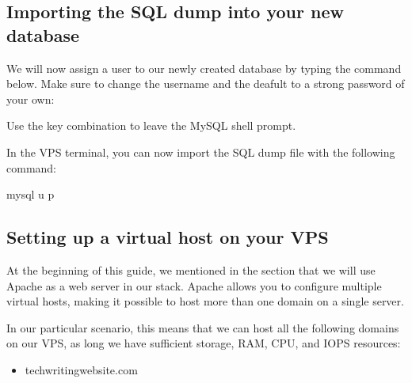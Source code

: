 \documentclass[a4paper,10pt,english,openany,oneside]{sphinxmanual}
\begin{document}
\begin{sloppypar}
\subsection{Importing the SQL dump into your new database}
\label{\detokenize{joomla-to-vps:importing-the-sql-dump-into-your-new-database}}
\sphinxAtStartPar
We will now assign a user  to our newly created database by typing the command below. Make sure to change the username  and the deafult  to a strong password of your own:

\begin{sphinxVerbatim}[commandchars=\\\{\}]
\end{sphinxVerbatim}

\sphinxAtStartPar
Use the key combination  to leave the MySQL shell prompt.

\sphinxAtStartPar
In the VPS terminal, you can now import the SQL dump file with the following command:

\begin{sphinxVerbatim}[commandchars=\\\{\}]
\PYGZdl{} mysql \PYGZhy{}u  \PYGZhy{}p  \PYGZlt{} 
\end{sphinxVerbatim}


\subsection{Setting up a virtual host on your VPS}
\label{\detokenize{joomla-to-vps:setting-up-a-virtual-host-on-your-vps}}
\sphinxAtStartPar
At the beginning of this guide, we mentioned in the {\hyperref[\detokenize{joomla-to-vps:requirements}]{}} section that we will use Apache as a web server in our stack. Apache allows you to configure multiple virtual hosts, making it possible to host more than one domain on a single server.

\sphinxAtStartPar
In our particular scenario, this means that we can host all the following domains on our VPS, as long we have sufficient storage, RAM, CPU, and IOPS resources:
\begin{itemize}
\item {} 
\sphinxAtStartPar
techwriting\sphinxhyphen{}website.com


\end{itemize}
\end{sloppypar}
\end{document}
